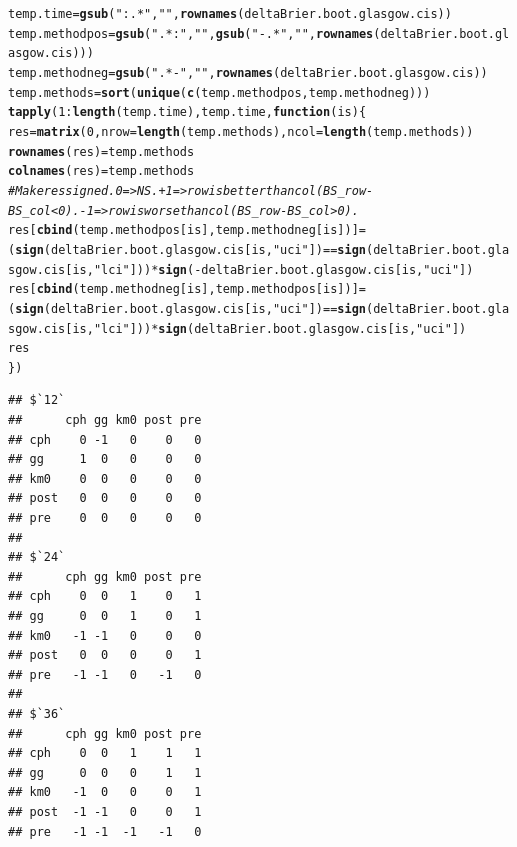\documentclass{article}\usepackage[]{graphicx}\usepackage[]{color}
\makeatletter
\newcommand{\hlnum}[1]{\textcolor[rgb]{0.686,0.059,0.569}{#1}}%
\newcommand{\hlstr}[1]{\textcolor[rgb]{0.192,0.494,0.8}{#1}}%
\newcommand{\hlcom}[1]{\textcolor[rgb]{0.678,0.584,0.686}{\textit{#1}}}%
\newcommand{\hlopt}[1]{\textcolor[rgb]{0,0,0}{#1}}%
\newcommand{\hlstd}[1]{\textcolor[rgb]{0.345,0.345,0.345}{#1}}%
\newcommand{\hlkwa}[1]{\textcolor[rgb]{0.161,0.373,0.58}{\textbf{#1}}}%
\newcommand{\hlkwb}[1]{\textcolor[rgb]{0.69,0.353,0.396}{#1}}%
\newcommand{\hlkwc}[1]{\textcolor[rgb]{0.333,0.667,0.333}{#1}}%
\newcommand{\hlkwd}[1]{\textcolor[rgb]{0.737,0.353,0.396}{\textbf{#1}}}%
\newenvironment{kframe}{%
 \def\at@end@of@kframe{}%
 \ifinner\ifhmode%
  \def\at@end@of@kframe{\end{minipage}}%
  \begin{minipage}{\columnwidth}%
 \fi\fi%
 \def\FrameCommand##1{\hskip\@totalleftmargin \hskip-\fboxsep
 \colorbox{shadecolor}{##1}\hskip-\fboxsep
     \hskip-\linewidth \hskip-\@totalleftmargin \hskip\columnwidth}%
 \MakeFramed {\advance\hsize-\width
   \@totalleftmargin\z@ \linewidth\hsize
   \@setminipage}}%
 {\par\unskip\endMakeFramed%
 \at@end@of@kframe}
\newenvironment{knitrout}{}{} %
\makeatother
\begin{document}
\begin{knitrout}
\color{fgcolor}\begin{kframe}
\begin{alltt}
\hlstd{temp.time} \hlkwb{=} \hlkwd{gsub}\hlstd{(}\hlstr{":.*"}\hlstd{,} \hlstr{""}\hlstd{,} \hlkwd{rownames}\hlstd{(deltaBrier.boot.glasgow.cis))}
\hlstd{temp.methodpos} \hlkwb{=} \hlkwd{gsub}\hlstd{(}\hlstr{".*:"}\hlstd{,} \hlstr{""}\hlstd{,} \hlkwd{gsub}\hlstd{(}\hlstr{"-.*"}\hlstd{,} \hlstr{""}\hlstd{,} \hlkwd{rownames}\hlstd{(deltaBrier.boot.glasgow.cis)))}
\hlstd{temp.methodneg} \hlkwb{=} \hlkwd{gsub}\hlstd{(}\hlstr{".*-"}\hlstd{,} \hlstr{""}\hlstd{,} \hlkwd{rownames}\hlstd{(deltaBrier.boot.glasgow.cis))}
\hlstd{temp.methods} \hlkwb{=} \hlkwd{sort}\hlstd{(}\hlkwd{unique}\hlstd{(}\hlkwd{c}\hlstd{(temp.methodpos, temp.methodneg)))}
\hlkwd{tapply}\hlstd{(}\hlnum{1}\hlopt{:}\hlkwd{length}\hlstd{(temp.time), temp.time,} \hlkwa{function}\hlstd{(}\hlkwc{is}\hlstd{) \{}
        \hlstd{res} \hlkwb{=} \hlkwd{matrix}\hlstd{(}\hlnum{0}\hlstd{,} \hlkwc{nrow} \hlstd{=} \hlkwd{length}\hlstd{(temp.methods),} \hlkwc{ncol} \hlstd{=} \hlkwd{length}\hlstd{(temp.methods))}
        \hlkwd{rownames}\hlstd{(res)} \hlkwb{=} \hlstd{temp.methods}
        \hlkwd{colnames}\hlstd{(res)} \hlkwb{=} \hlstd{temp.methods}
        \hlcom{# Make res signed.  0 => NS.  +1 => row is better than col (BS_row - BS_col < 0).  -1 => row is worse than col (BS_row - BS_col > 0).}
        \hlstd{res[}\hlkwd{cbind}\hlstd{(temp.methodpos[is], temp.methodneg[is])]} \hlkwb{=} \hlstd{(}\hlkwd{sign}\hlstd{(deltaBrier.boot.glasgow.cis[is,} \hlstr{"uci"}\hlstd{])} \hlopt{==} \hlkwd{sign}\hlstd{(deltaBrier.boot.glasgow.cis[is,} \hlstr{"lci"}\hlstd{]))} \hlopt{*} \hlkwd{sign}\hlstd{(}\hlopt{-}\hlstd{deltaBrier.boot.glasgow.cis[is,} \hlstr{"uci"}\hlstd{])}
        \hlstd{res[}\hlkwd{cbind}\hlstd{(temp.methodneg[is], temp.methodpos[is])]} \hlkwb{=} \hlstd{(}\hlkwd{sign}\hlstd{(deltaBrier.boot.glasgow.cis[is,} \hlstr{"uci"}\hlstd{])} \hlopt{==} \hlkwd{sign}\hlstd{(deltaBrier.boot.glasgow.cis[is,} \hlstr{"lci"}\hlstd{]))} \hlopt{*} \hlkwd{sign}\hlstd{(deltaBrier.boot.glasgow.cis[is,} \hlstr{"uci"}\hlstd{])}
        \hlstd{res}
\hlstd{\})}
\end{alltt}
\begin{verbatim}
## $`12`
##      cph gg km0 post pre
## cph    0 -1   0    0   0
## gg     1  0   0    0   0
## km0    0  0   0    0   0
## post   0  0   0    0   0
## pre    0  0   0    0   0
## 
## $`24`
##      cph gg km0 post pre
## cph    0  0   1    0   1
## gg     0  0   1    0   1
## km0   -1 -1   0    0   0
## post   0  0   0    0   1
## pre   -1 -1   0   -1   0
## 
## $`36`
##      cph gg km0 post pre
## cph    0  0   1    1   1
## gg     0  0   0    1   1
## km0   -1  0   0    0   1
## post  -1 -1   0    0   1
## pre   -1 -1  -1   -1   0
\end{verbatim}
\end{kframe}
\end{knitrout}
\end{document}
